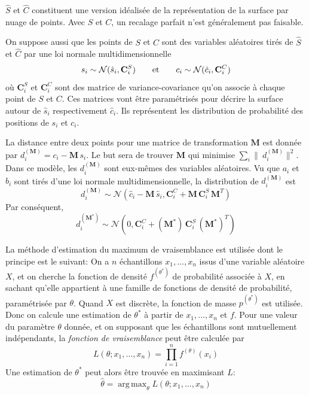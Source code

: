 \documentclass[a4paper,10pt]{scrreprt}
\DeclareMathOperator*{\argmax}{arg\,max}
\begin{document}
$\hat{S}$ et $\hat{C}$ constituent une version idéalisée de la représentation de la surface par nuage de points. Avec $S$ et $C$, un recalage parfait n'est généralement pas faisable.

On suppose aussi que les points de $S$ et $C$ sont des variables aléatoires tirés de $\hat{S}$ et $\hat{C}$ par une loi normale multidimensionnelle
\begin{equation}
	s_i \sim \mathcal{N}(\hat{s}_i, \mathbf{C}^S_i)
	\hspace{7mm} \text{et} \hspace{7mm}
	c_i \sim \mathcal{N}(\hat{c}_i, \mathbf{C}^C_i)
\end{equation}
où $\mathbf{C}^S_i$ et $\mathbf{C}^C_i$ sont des matrice de variance-covariance qu'on associe à chaque point de $S$ et $C$. Ces matrices vont être paramétrisés pour décrire la surface autour de $\hat{s}_i$ respectivement $\hat{c}_i$. Ils représentent les distribution de probabilité des positions de $s_i$ et $c_i$.

La distance entre deux points pour une matrice de transformation $\mathbf{M}$ est donnée par $d^{(\mathbf{M})}_i = c_i - \mathbf{M} \, s_i$. Le but sera de trouver $\mathbf{M}$ qui minimise $\sum_{i} \|\ d^{(\mathbf{M})}_i \|^2$. Dans ce modèle, les $d^{(\mathbf{M})}_i$ sont eux-mêmes des variables aléatoires. Vu que $a_i$ et $b_i$ sont tirés d'une loi normale multidimensionnelle, la distribution de $d^{(\mathbf{M})}_i$ est
\begin{equation} \label{eq:dist_distr}
	d^{(\mathbf{M})}_i \sim \mathcal{N}(\hat{c}_i - \mathbf{M}\,\hat{s}_i, \mathbf{C}^C_i + \mathbf{M}\,\mathbf{C}^S_i\,\mathbf{M}^T)
\end{equation}
Par conséquent,
\begin{equation}
	d^{(\mathbf{M}^*)}_i \sim \mathcal{N}(0, \mathbf{C}^C_i + (\mathbf{M}^*)\,\mathbf{C}^S_i\,(\mathbf{M}^*)^T)
\end{equation}

La méthode d'estimation du maximum de vraisemblance est utilisée dont le principe est le suivant: On a $n$ échantillons $x_1, \ldots, x_n$ issus d'une variable aléatoire $X$, et on cherche la fonction de densité $f^{(\theta^*)}$ de probabilité associée à $X$, en sachant qu'elle appartient à une famille de fonctions de densité de probabilité, paramétrisée par $\theta$. Quand $X$ est discrète, la fonction de masse $p^{(\theta^*)}$ est utilisée. Donc on calcule une estimation de $\theta^*$ à partir de $x_1, \ldots, x_n$ et $f$. Pour une valeur du paramètre $\theta$ donnée, et on supposant que les échantillons sont mutuellement indépendants, la \emph{fonction de vraisemblance} peut être calculée par
\begin{equation}
	L(\theta; x_1, \ldots, x_n) = \prod_{i=1}^{n} f^{(\theta)}(x_i)
\end{equation}
Une estimation de $\theta^*$ peut alors être trouvée en maximisant $L$:
\begin{equation}
	\hat{\theta} = \argmax_{\theta} L(\theta; x_1, \ldots, x_n)
\end{equation}
\end{document}
